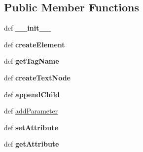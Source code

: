 \subsection*{Public Member Functions}
\begin{DoxyCompactItemize}
\item 
\hypertarget{classcore_1_1misc_1_1xmlwriter1_1_1_xml_element_a1240eb3c80ea2bbd9a498477564239d9}{def {\bfseries \+\_\+\+\_\+init\+\_\+\+\_\+}}\label{classcore_1_1misc_1_1xmlwriter1_1_1_xml_element_a1240eb3c80ea2bbd9a498477564239d9}

\item 
\hypertarget{classcore_1_1misc_1_1xmlwriter1_1_1_xml_element_a27e041d93b7397c9dec37d1a60ab111d}{def {\bfseries create\+Element}}\label{classcore_1_1misc_1_1xmlwriter1_1_1_xml_element_a27e041d93b7397c9dec37d1a60ab111d}

\item 
\hypertarget{classcore_1_1misc_1_1xmlwriter1_1_1_xml_element_a7faac3479dc37ed40d2b542ff8e3ea79}{def {\bfseries get\+Tag\+Name}}\label{classcore_1_1misc_1_1xmlwriter1_1_1_xml_element_a7faac3479dc37ed40d2b542ff8e3ea79}

\item 
\hypertarget{classcore_1_1misc_1_1xmlwriter1_1_1_xml_element_ace9f824c30aca996b54361f7b85b6fe0}{def {\bfseries create\+Text\+Node}}\label{classcore_1_1misc_1_1xmlwriter1_1_1_xml_element_ace9f824c30aca996b54361f7b85b6fe0}

\item 
\hypertarget{classcore_1_1misc_1_1xmlwriter1_1_1_xml_element_ac3b741a84ca57cce9cd35b7b2b76f1be}{def {\bfseries append\+Child}}\label{classcore_1_1misc_1_1xmlwriter1_1_1_xml_element_ac3b741a84ca57cce9cd35b7b2b76f1be}

\item 
def \hyperlink{classcore_1_1misc_1_1xmlwriter1_1_1_xml_element_ab05f952634b2e111c8c0a53546227327}{add\+Parameter}
\item 
\hypertarget{classcore_1_1misc_1_1xmlwriter1_1_1_xml_element_aa9fcb47b7cbb6dfef28e9d36826b37a6}{def {\bfseries set\+Attribute}}\label{classcore_1_1misc_1_1xmlwriter1_1_1_xml_element_aa9fcb47b7cbb6dfef28e9d36826b37a6}

\item 
\hypertarget{classcore_1_1misc_1_1xmlwriter1_1_1_xml_element_ac25033a054ad138472b5308c0c4aa808}{def {\bfseries get\+Attribute}}\label{classcore_1_1misc_1_1xmlwriter1_1_1_xml_element_ac25033a054ad138472b5308c0c4aa808}

\end{DoxyCompactItemize}
